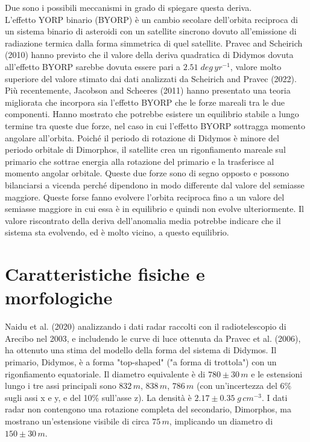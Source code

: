 \documentclass[a4paper,11pt,openright]{book}
\begin{document}
Due sono i possibili meccanismi in grado di spiegare questa deriva.\\
L'effetto YORP binario (BYORP) è un cambio secolare dell'orbita reciproca di un sistema binario di asteroidi con un satellite sincrono dovuto all'emissione di radiazione termica dalla forma simmetrica di quel satellite. Pravec and Scheirich (2010) hanno previsto che il valore della deriva quadratica di Didymos dovuta all'effetto BYORP sarebbe dovuta essere pari a $2.51\;deg\,yr^{-1}$, valore molto superiore del valore stimato dai dati analizzati da Scheirich and Pravec (2022). Più recentemente, Jacobson and Scheeres (2011) hanno presentato una teoria migliorata che incorpora sia l'effetto BYORP che le forze mareali tra le due componenti. Hanno mostrato che potrebbe esistere un equilibrio stabile a lungo termine tra queste due forze, nel caso in cui l'effetto BYORP sottragga momento angolare all'orbita. Poiché il periodo di rotazione di Didymos è minore del periodo orbitale di Dimorphos, il satellite crea un rigonfiamento mareale sul primario che sottrae energia alla rotazione del primario e la trasferisce al momento angolar orbitale. Queste due forze sono di segno opposto e possono bilanciarsi a vicenda perché dipendono in modo differente dal valore del semiasse maggiore. Queste forse fanno evolvere l'orbita reciproca fino a un valore del semiasse maggiore in cui essa è in equilibrio e quindi non evolve ulteriormente. Il valore riscontrato della deriva dell'anomalia media potrebbe indicare che il sistema sta evolvendo, ed è molto vicino, a questo equilibrio.\\



\section{Caratteristiche fisiche e morfologiche}
Naidu et al. (2020) analizzando i dati radar raccolti con il radiotelescopio di Arecibo nel 2003, e includendo le curve di luce ottenuta da Pravec et al. (2006), ha ottenuto una stima del modello della forma del sistema di Didymos. Il primario, Didymos, è a forma "top-shaped" ("a forma di trottola") con un rigonfiamento equatoriale. Il diametro equivalente è di $780\pm 30\,m$ e le estensioni lungo i tre assi principali sono $832\,m$, $838\,m$, $786\,m$ (con un'incertezza del 6\% sugli assi x e y, e del 10\% sull'asse z). La densità è $2.17\pm 0.35\;g\,cm^{-3}$. I dati radar non contengono una rotazione completa del secondario, Dimorphos, ma mostrano un'estensione visibile di circa $75\,m$, implicando un diametro di $150\pm 30\,m$.
\end{document}

